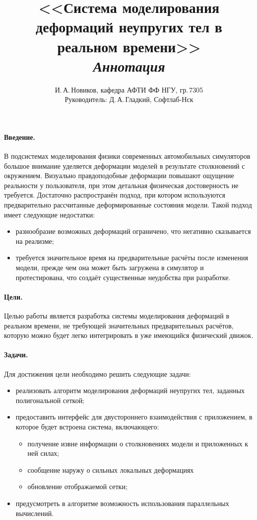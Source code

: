 \documentclass[a4paper,11pt]{article}
\author{И.\,А.\,Новиков, кафедра АФТИ ФФ НГУ, гр.\,7305\\ Руководитель: Д.\,А.\,Гладкий, Софтлаб-Нск}
\title{<<Система моделирования деформаций неупругих тел в реальном времени>>\\\itshape Аннотация}
\begin{document}
  \maketitle
  \thispagestyle{empty}
  \paragraph{Введение.}
    В подсистемах моделирования физики современных автомобильных симуляторов большое внимание
    уделяется деформации моделей в результате столкновений с окружением. Визуально
    правдоподобные деформации повышают ощущение реальности у пользователя, при этом детальная
    физическая достоверность не требуется. Достаточно распространён подход, при
    котором используются предварительно рассчитанные деформированные состояния модели.
    Такой подход имеет следующие недостатки:
    \begin{itemize}
      \item разнообразие возможных деформаций ограничено, что негативно сказывается на реализме;
      \item требуется значительное время на предварительные расчёты после изменения модели, прежде чем
        она может быть загружена в симулятор и протестирована, что создаёт существенные неудобства при разработке.
    \end{itemize}
  \paragraph{Цели.}
    Целью работы является разработка системы моделирования деформаций в реальном
    времени, не требующей значительных предварительных расчётов, которую можно будет легко
    интегрировать в уже имеющийся физический движок.
  \paragraph{Задачи.}
    Для достижения цели необходимо решить следующие задачи:
    \begin{itemize}
      \item реализовать алгоритм моделирования деформаций неупругих тел, заданных полигональной сеткой;
      \item предоставить интерфейс для двустороннего взаимодействия с приложением, в которое будет
        встроена система, включающего:
        \begin{itemize}
          \item получение извне информации о столкновениях модели и приложенных к ней силах;
          \item сообщение наружу о сильных локальных деформациях
          \item обновление отображаемой сетки;
        \end{itemize}
      \item предусмотреть в алгоритме возможность использования параллельных вычислений.
    \end{itemize}
\end{document}
